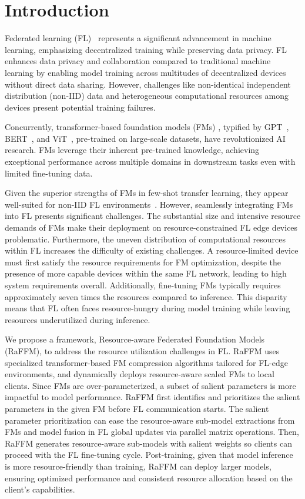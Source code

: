 \section{Introduction}
Federated learning (FL)~\citep{mcmahan2017fedavg} represents a significant advancement in machine learning, emphasizing decentralized training while preserving data privacy. FL enhances data privacy and collaboration compared to traditional machine learning by enabling model training across multitudes of decentralized devices without direct data sharing. However, challenges like non-identical independent distribution (non-IID) data and heterogeneous computational resources among devices present potential training failures.


Concurrently, transformer-based foundation models (FMs) \citep{Bommasani2021FoundationModels}, typified by GPT~\citep{radford2019gpt2,brown2020gpt3,openai2023gpt4}, BERT~\citep{kenton2019bert}, and ViT~\citep{dosovitskiy2020vit}, pre-trained on large-scale datasets, have revolutionized AI research. 
FMs leverage their inherent pre-trained knowledge, achieving exceptional performance across multiple domains in downstream tasks even with limited fine-tuning data.


Given the superior strengths of FMs in few-shot transfer learning, they appear well-suited for non-IID FL environments~\citep{yu2023ffm,zhuang2023foundationfl}. However, seamlessly integrating FMs into FL presents significant challenges. The substantial size and intensive resource demands of FMs make their deployment on resource-constrained FL edge devices problematic. Furthermore, the uneven distribution of computational resources within FL increases the difficulty of existing challenges. A resource-limited device must first satisfy the resource requirements for FM optimization, despite the presence of more capable devices within the same FL network, leading to high system requirements overall.
Additionally, fine-tuning FMs typically requires approximately seven times the resources compared to inference. This disparity means that FL often faces resource-hungry during model training while leaving resources underutilized during inference.

We propose a framework, Resource-aware Federated Foundation Models (RaFFM), to address the resource utilization challenges in FL. RaFFM uses specialized transformer-based FM compression algorithms tailored for FL-edge environments, and dynamically deploys resource-aware scaled FMs to local clients. 
Since FMs are over-parameterized, a subset of salient parameters is more impactful to model performance. RaFFM first identifies and prioritizes the salient parameters in the given FM before FL communication starts. The salient parameter prioritization can ease the resource-aware sub-model extractions from FMs and model fusion in FL global updates via parallel matrix operations.
Then, RaFFM generates resource-aware sub-models with salient weights so clients can proceed with the FL fine-tuning cycle.
Post-training, given that model inference is more resource-friendly than training, RaFFM can deploy larger models, ensuring optimized performance and consistent resource allocation based on the client's capabilities.

